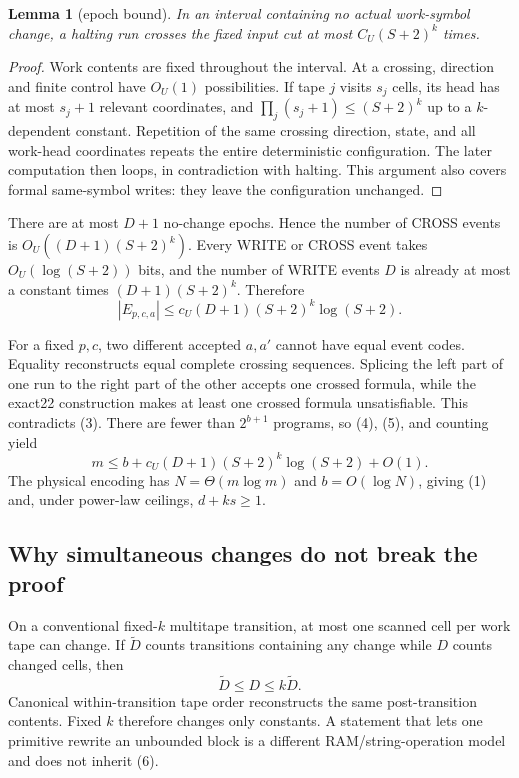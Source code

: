 \documentclass[11pt]{article}
\newtheorem{lemma}{Lemma}
\begin{document}
\begin{lemma}[epoch bound]
In an interval containing no actual work-symbol change, a halting run crosses
the fixed input cut at most $C_U(S+2)^k$ times.
\end{lemma}
\begin{proof}
Work contents are fixed throughout the interval.  At a crossing, direction and
finite control have $O_U(1)$ possibilities.  If tape $j$ visits $s_j$ cells,
its head has at most $s_j+1$ relevant coordinates, and
$\prod_j(s_j+1)\le (S+2)^k$ up to a $k$-dependent constant.  Repetition of the
same crossing direction, state, and all work-head coordinates repeats the
entire deterministic configuration.  The later computation then loops, in
contradiction with halting.  This argument also covers formal same-symbol
writes: they leave the configuration unchanged.
\end{proof}

There are at most $D+1$ no-change epochs.  Hence the number of CROSS events is
$O_U((D+1)(S+2)^k)$.  Every WRITE or CROSS event takes
$O_U(\log(S+2))$ bits, and the number of WRITE events $D$ is already at most a
constant times $(D+1)(S+2)^k$.  Therefore
\[
 |E_{p,c,a}|\le c_U(D+1)(S+2)^k\log(S+2).
 \tag{5}
\]

For a fixed $p,c$, two different accepted $a,a'$ cannot have equal event
codes.  Equality reconstructs equal complete crossing sequences.  Splicing
the left part of one run to the right part of the other accepts one crossed
formula, while the exact22 construction makes at least one crossed formula
unsatisfiable.  This contradicts (3).  There are fewer than $2^{b+1}$ programs,
so (4), (5), and counting yield
\[
 m\le b+c_U(D+1)(S+2)^k\log(S+2)+O(1).
 \tag{6}
\]
The physical encoding has $N=\Theta(m\log m)$ and $b=O(\log N)$, giving (1)
and, under power-law ceilings, $d+ks\ge 1$.

\subsection{Why simultaneous changes do not break the proof}
On a conventional fixed-$k$ multitape transition, at most one scanned cell per
work tape can change.  If $\widetilde D$ counts transitions containing any
change while $D$ counts changed cells, then
\[
 \widetilde D\le D\le k\widetilde D.
 \tag{7}
\]
Canonical within-transition tape order reconstructs the same post-transition
contents.  Fixed $k$ therefore changes only constants.  A statement that lets
one primitive rewrite an unbounded block is a different RAM/string-operation
model and does not inherit (6).
\end{document}
